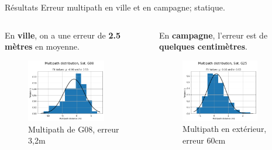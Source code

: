 \documentclass[xcolor=dvipsnames,envcountsect]{beamer}
\begin{document}
\begin{frame}{Résultats}
	Erreur multipath en ville et en campagne; statique.
	\newline
	\begin{columns}
		\begin{column}{0.5\textwidth}
			{\small En \textbf{ville}, on a une erreur de \textbf{2.5 mètres} en moyenne.}
			\begin{figure}
				\centering
				\includegraphics[width=0.8\textwidth]{./Figures/MP_G08_dis.png}
				\caption {Multipath de G08, erreur 3,2m}
			\end{figure}
		\end{column}

		\begin{column}{0.5\textwidth}
			{\small En \textbf{campagne}, l'erreur est de \textbf{quelques centimètres}.}
			\begin{figure}
				\centering
				\includegraphics[width=0.8\textwidth]{./Figures/MP_G25_dis_camp.png}
				\caption {Multipath en extérieur, erreur 60cm}
			\end{figure}
		\end{column}
	\end{columns}
\end{frame}
\end{document}
